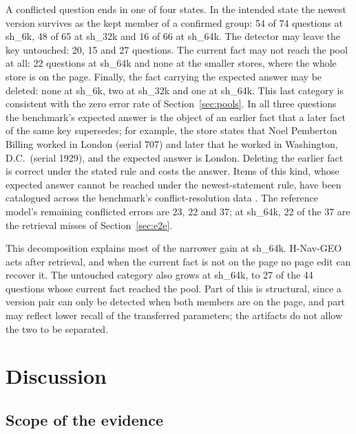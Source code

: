 \documentclass{CUP-JNL-NLP}
\newcommand{\sub}[1]{\textsf{sh\_#1}}                    %
\newcommand{\geo}{H-Nav-GEO}
\begin{document}
A conflicted question ends in one of four states. In the intended state the newest version survives as the kept member of a confirmed group: 54 of 74 questions at \sub{6k}, 48 of 65 at \sub{32k} and 16 of 66 at \sub{64k}. The detector may leave the key untouched: 20, 15 and 27 questions. The current fact may not reach the pool at all: 22 questions at \sub{64k} and none at the smaller stores, where the whole store is on the page. Finally, the fact carrying the expected answer may be deleted: none at \sub{6k}, two at \sub{32k} and one at \sub{64k}. This last category is consistent with the zero error rate of Section~\ref{sec:pools}. In all three questions the benchmark's expected answer is the object of an earlier fact that a later fact of the same key supersedes; for example, the store states that Noel Pemberton Billing worked in London (serial 707) and later that he worked in Washington, D.C.\ (serial 1929), and the expected answer is London. Deleting the earlier fact is correct under the stated rule and costs the answer. Items of this kind, whose expected answer cannot be reached under the newest-statement rule, have been catalogued across the benchmark's conflict-resolution data \citep{pakhomov2026bookkeeping}. The reference model's remaining conflicted errors are 23, 22 and 37; at \sub{64k}, 22 of the 37 are the retrieval misses of Section~\ref{sec:e2e}.

This decomposition explains most of the narrower gain at \sub{64k}. \geo{} acts after retrieval, and when the current fact is not on the page no page edit can recover it. The untouched category also grows at \sub{64k}, to 27 of the 44 questions whose current fact reached the pool. Part of this is structural, since a version pair can only be detected when both members are on the page, and part may reflect lower recall of the transferred parameters; the artifacts do not allow the two to be separated.

\section{Discussion}
\label{sec:discussion}

\subsection{Scope of the evidence}
\label{sec:scope}
\end{document}
